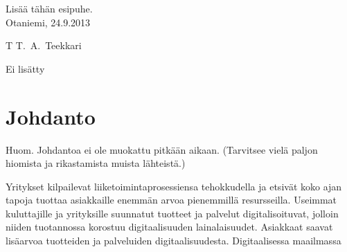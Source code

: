 \documentclass[finnish,12pt,a4paper,pdftex]{article}
\begin{document}
Lisää tähän esipuhe.\\

\vspace{5cm}
Otaniemi, 24.9.2013

\vspace{5mm}
{\hfill T T.\ A.\ Teekkari \hspace{1cm}}

\newpage


\thesistableofcontents



Ei lisätty


\cleardoublepage
\storeinipagenumber
{}
\setcounter{page}{1}


\section{Johdanto}

\thispagestyle{empty}
Huom. Johdantoa ei ole muokattu pitkään aikaan.
(Tarvitsee vielä paljon hiomista ja rikastamista muista lähteistä.) 

Yritykset kilpailevat liiketoimintaprosessiensa tehokkudella ja etsivät koko ajan tapoja tuottaa asiakkaille enemmän arvoa pienemmillä resursseilla. Useimmat kuluttajille ja yrityksille suunnatut tuotteet ja palvelut digitalisoituvat, jolloin niiden tuotannossa korostuu digitaalisuuden lainalaisuudet. Asiakkaat saavat lisäarvoa tuotteiden ja palveluiden digitaalisuudesta. Digitaalisessa maailmassa 
\end{document}
